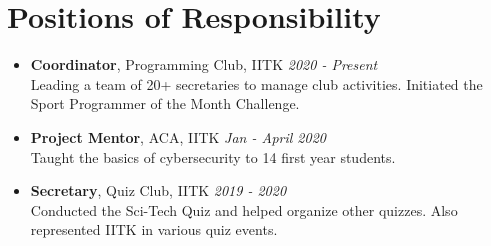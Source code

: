 \section*{\sc Positions of Responsibility}
\vspace{-2mm}
\hrulefill
\vspace{1mm}

\begin{itemize}

\item \textbf{Coordinator}, Programming Club, IITK \hfill\textit{2020 - Present}\\
Leading a team of 20+ secretaries to manage club activities. Initiated the Sport Programmer of the Month Challenge.

\vspace{0.5mm}

\item \textbf{Project Mentor}, ACA, IITK \hfill\textit{Jan - April 2020}\\
Taught the basics of cybersecurity to 14 first year students.

\vspace{0.5mm}

\item \textbf{Secretary}, Quiz Club, IITK \hfill\textit{2019 - 2020}\\
Conducted the Sci-Tech Quiz and helped organize other quizzes. Also represented IITK in various quiz events.


\end{itemize}
